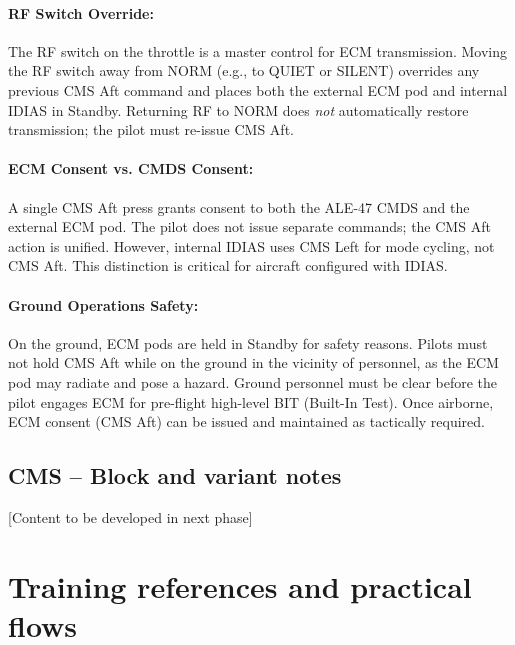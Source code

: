 \documentclass[11pt,a4paper]{article}
\begin{document}
\paragraph*{RF Switch Override:}
The RF switch on the throttle is a master control for ECM transmission. Moving the RF switch away from NORM (e.g., to QUIET or SILENT) overrides any previous CMS Aft command and places both the external ECM pod and internal IDIAS in Standby. Returning RF to NORM does \textit{not} automatically restore transmission; the pilot must re-issue CMS Aft.

\paragraph*{ECM Consent vs. CMDS Consent:}
A single CMS Aft press grants consent to both the ALE-47 CMDS and the external ECM pod. The pilot does not issue separate commands; the CMS Aft action is unified. However, internal IDIAS uses CMS Left for mode cycling, not CMS Aft. This distinction is critical for aircraft configured with IDIAS.

\paragraph*{Ground Operations Safety:}
On the ground, ECM pods are held in Standby for safety reasons. Pilots must not hold CMS Aft while on the ground in the vicinity of personnel, as the ECM pod may radiate and pose a hazard. Ground personnel must be clear before the pilot engages ECM for pre-flight high-level BIT (Built-In Test). Once airborne, ECM consent (CMS Aft) can be issued and maintained as tactically required.

\subsection{CMS -- Block and variant notes}
[Content to be developed in next phase]

\section{Training references and practical flows}
\end{document}
